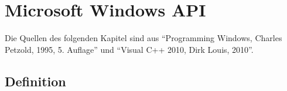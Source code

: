 \newpage





\section{Microsoft Windows API}

Die Quellen des folgenden Kapitel sind aus "`Programming Windows, Charles Petzold, 1995, 5. Auflage"' und "`Visual C++ 2010, Dirk Louis, 2010"'.

\subsection{Definition}

